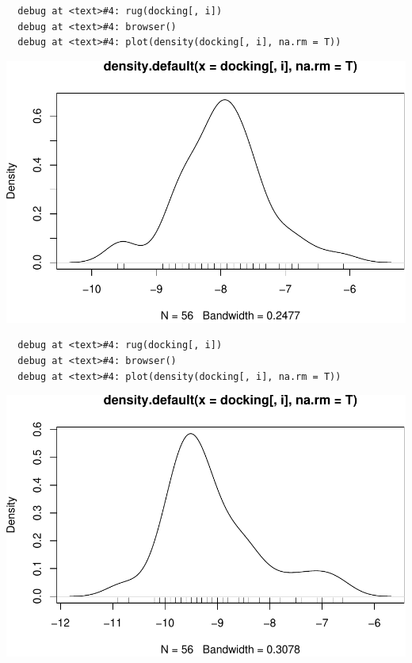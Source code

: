 \documentclass[12pt,twoside]{reedthesis}
\begin{document}
  \begin{verbatim}
  debug at <text>#4: rug(docking[, i])
  debug at <text>#4: browser()
  debug at <text>#4: plot(density(docking[, i], na.rm = T))
  \end{verbatim}
  
  \begin{center}\includegraphics{tesis_files/figure-latex/johan-8} \end{center}
  
  \begin{verbatim}
  debug at <text>#4: rug(docking[, i])
  debug at <text>#4: browser()
  debug at <text>#4: plot(density(docking[, i], na.rm = T))
  \end{verbatim}
  
  \begin{center}\includegraphics{tesis_files/figure-latex/johan-9} \end{center}
  
\end{document}
